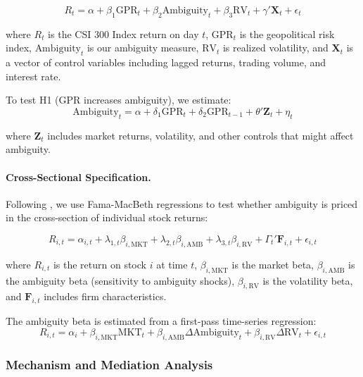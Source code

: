 \documentclass[preprint,12pt,authoryear]{elsarticle}
\begin{document}
\begin{equation}
R_{t} = \alpha + \beta_1 \text{GPR}_{t} + \beta_2 \text{Ambiguity}_{t} + \beta_3 \text{RV}_{t} + \gamma' \mathbf{X}_{t} + \epsilon_{t}
\end{equation}

where $R_t$ is the CSI 300 Index return on day $t$, $\text{GPR}_t$ is the geopolitical risk index, $\text{Ambiguity}_t$ is our ambiguity measure, $\text{RV}_t$ is realized volatility, and $\mathbf{X}_t$ is a vector of control variables including lagged returns, trading volume, and interest rate.

To test H1 (GPR increases ambiguity), we estimate:
\begin{equation}
\text{Ambiguity}_{t} = \alpha + \delta_1 \text{GPR}_{t} + \delta_2 \text{GPR}_{t-1} + \theta' \mathbf{Z}_{t} + \eta_{t}
\end{equation}

where $\mathbf{Z}_t$ includes market returns, volatility, and other controls that might affect ambiguity.

\paragraph{Cross-Sectional Specification.}
Following \citet{fama1992cross}, we use Fama-MacBeth regressions to test whether ambiguity is priced in the cross-section of individual stock returns:

\begin{equation}
R_{i,t} = \alpha_{i,t} + \lambda_{1,t} \beta_{i,\text{MKT}} + \lambda_{2,t} \beta_{i,\text{AMB}} + \lambda_{3,t} \beta_{i,\text{RV}} + \Gamma_{t}' \mathbf{F}_{i,t} + \epsilon_{i,t}
\end{equation}

where $R_{i,t}$ is the return on stock $i$ at time $t$, $\beta_{i,\text{MKT}}$ is the market beta, $\beta_{i,\text{AMB}}$ is the ambiguity beta (sensitivity to ambiguity shocks), $\beta_{i,\text{RV}}$ is the volatility beta, and $\mathbf{F}_{i,t}$ includes firm characteristics.

The ambiguity beta is estimated from a first-pass time-series regression:
\begin{equation}
R_{i,t} = \alpha_i + \beta_{i,\text{MKT}} \text{MKT}_t + \beta_{i,\text{AMB}} \Delta \text{Ambiguity}_t + \beta_{i,\text{RV}} \Delta \text{RV}_t + \epsilon_{i,t}
\end{equation}

\subsubsection{Mechanism and Mediation Analysis}
\end{document}
